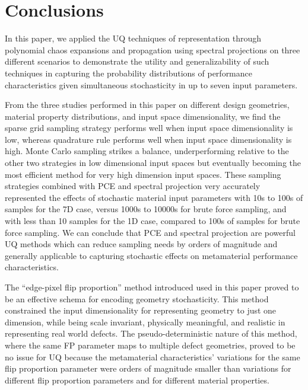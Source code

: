 \documentclass[preprint,review,12pt]{elsarticle}
\begin{document}
\section{Conclusions}
\label{sec:Conclusion}
In this paper, we applied the UQ techniques of representation through polynomial chaos expansions and propagation using spectral projections on three different scenarios to demonstrate the utility and generalizability of such techniques in capturing the probability distributions of performance characteristics given simultaneous stochasticity in up to seven input parameters.

From the three studies performed in this paper on different design geometries, material property distributions, and input space dimensionality, we find the sparse grid sampling strategy performs well when input space dimensionality is low, whereas quadrature rule performs well when input space dimensionality is high. Monte Carlo sampling strikes a balance, underperforming relative to the other two strategies in low dimensional input spaces but eventually becoming the most efficient method for very high dimension input spaces. These sampling strategies combined with PCE and spectral projection very accurately represented the effects of stochastic material input parameters with 10s to 100s of  samples for the 7D case, versus 1000s to 10000s for brute force sampling, and with less than 10 samples for the 1D case, compared to 100s of samples for brute force sampling. We can conclude that PCE and spectral projection are powerful UQ methods which can reduce sampling needs by orders of magnitude and generally applicable to capturing stochastic effects on metamaterial performance characteristics. 

The ``edge-pixel flip proportion'' method introduced used in this paper proved to be an effective schema for encoding geometry stochasticity. This method constrained the input dimensionality for representing geometry to just one dimension, while being scale invariant, physically meaningful, and realistic in representing real world defects. The pseudo-deterministic nature of this method, where the same FP parameter maps to multiple defect geometries, proved to be no issue for UQ because the metamaterial characteristics' variations for the same flip proportion parameter were orders of magnitude smaller than variations for different flip proportion parameters and for different material properties.
\end{document}
